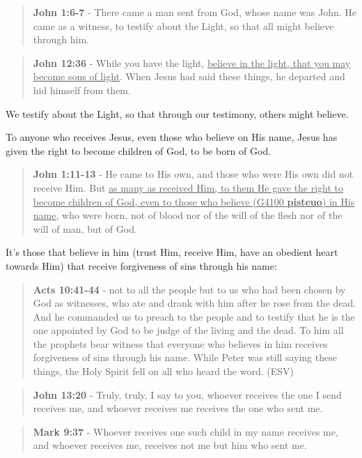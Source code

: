 \documentclass[11pt]{article}
\begin{document}
\begin{quote}
\textbf{John 1:6-7} - There came a man sent from God, whose name was John. He came as a witness, to testify about the Light, so that all might believe through him.
\end{quote}

\begin{quote}
\textbf{John 12:36} - While you have the light, \uline{believe in the light, that you may become sons of light}. When Jesus had said these things, he departed and hid himself from them.
\end{quote}

We testify about the Light, so that through our testimony, others might believe.

To anyone who receives Jesus, even those who believe on His name, Jesus has given the right to become children of God, to be born of God.

\begin{quote}
\textbf{John 1:11-13} - He came to His own, and those who were His own did not receive Him. But \uline{as many as received Him, to them He gave the right to become children of God, even to those who believe (G4100 \textbf{pisteuo}) in His name}, who were born, not of blood nor of the will of the flesh nor of the will of man, but of God.
\end{quote}

It's those that believe in him (trust Him, receive Him, have an obedient heart towards Him) that receive forgiveness of sins through his name:

\begin{quote}
\textbf{Acts 10:41-44} - not to all the people but to us who had been chosen by God as witnesses, who ate and drank with him after he rose from the dead. And he commanded us to preach to the people and to testify that he is the one appointed by God to be judge of the living and the dead. To him all the prophets bear witness that everyone who believes in him receives forgiveness of sins through his name. While Peter was still saying these things, the Holy Spirit fell on all who heard the word. (ESV)
\end{quote}

\begin{quote}
\textbf{John 13:20} - Truly, truly, I say to you, whoever receives the one I send receives me, and whoever receives me receives the one who sent me.
\end{quote}

\begin{quote}
\textbf{Mark 9:37} - Whoever receives one such child in my name receives me, and whoever receives me, receives not me but him who sent me.
\end{quote}
\end{document}

